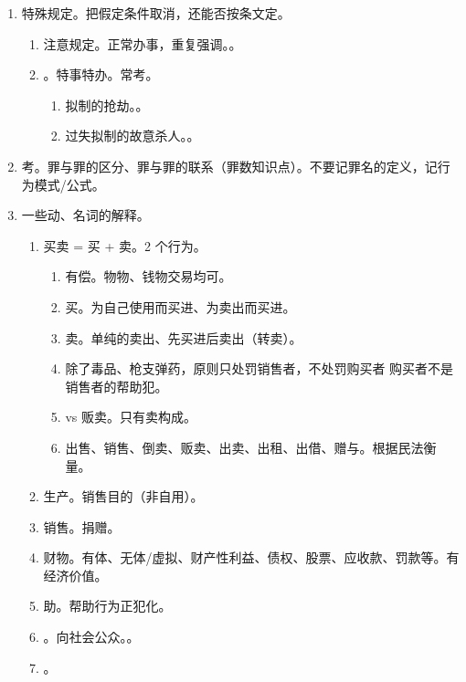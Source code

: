 \begin{enumerate}
  \item 特殊规定。把假定条件取消，还能否按条文定。
        \begin{enumerate}
          \item 注意规定。正常办事，重复强调。。
          \item {}。特事特办。常考。
                \begin{enumerate}
                  \item 拟制的抢劫。。
                  \item 过失拟制的故意杀人。。
                \end{enumerate}
        \end{enumerate}
  \item 考。罪与罪的区分、罪与罪的联系（罪数知识点）。不要记罪名的定义，记行为模式/公式。
  \item 一些动、名词的解释。
        \begin{enumerate}
          \item 买卖 = 买 + 卖。2 个行为。
                \begin{enumerate}
                  \item 有偿。物物、钱物交易均可。
                  \item 买。为自己使用而买进、为卖出而买进。
                  \item 卖。单纯的卖出、先买进后卖出（转卖）。
                  \item 除了毒品、枪支弹药，原则只处罚销售者，不处罚购买者 \yjt 购买者不是销售者的帮助犯。
                  \item vs 贩卖。只有卖构成。
                  \item 出售、销售、倒卖、贩卖、出卖、出租、出借、赠与。根据民法衡量。
                \end{enumerate}
          \item 生产。销售目的（非自用）。
          \item 销售。\bdy 捐赠。
          \item 财物。有体、无体/虚拟、财产性利益、债权、股票、应收款、罚款等。有经济价值。
          \item 助。帮助行为正犯化。
          \item {}。向社会公众。。
          \item {}。

\end{enumerate}
\end{enumerate}
